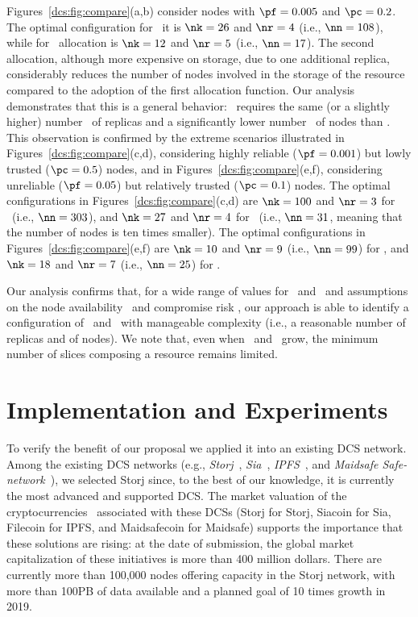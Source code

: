 {Figures~\ref{dcs:fig:compare}(a,b) consider nodes with $\pf=0.005$ and
$\pc=0.2$. The optimal configuration for \diagonal\ it is $\nk=26$ and
$\nr=4$ (i.e., $\nn=108$), while for \compact\ allocation is $\nk=12$
and $\nr=5$ (i.e., $\nn=17$). The second allocation, although more
expensive on storage, due to one additional replica, considerably
reduces the number of nodes involved in the storage of the resource
compared to the adoption of the first allocation function. Our
analysis demonstrates that this is a general behavior:
\compact\ requires the same (or a slightly higher) number \R\ of
replicas and a significantly lower number \N\ of nodes than
\diagonal. This observation is confirmed by the extreme scenarios
illustrated in Figures~\ref{dcs:fig:compare}(c,d), considering highly
reliable ($\pf = 0.001$) but lowly trusted ($\pc = 0.5$) nodes, and in
Figures~\ref{dcs:fig:compare}(e,f), considering unreliable ($\pf = 0.05$)
but relatively trusted ($\pc = 0.1$) nodes.  The optimal
configurations in Figures~\ref{dcs:fig:compare}(c,d) are $\nk=100$ and
$\nr=3$ for \diagonal\ (i.e., $\nn=303$), and $\nk=27$ and $\nr=4$ for
\compact\ (i.e., $\nn=31$, meaning that the number of nodes is ten
times smaller). The optimal configurations in
Figures~\ref{dcs:fig:compare}(e,f) are $\nk=10$ and $\nr=9$ (i.e.,
$\nn=99$) for \diagonal, and $\nk=18$ and $\nr=7$ (i.e., $\nn=25$) for
\compact.


Our analysis confirms that, for a wide range of values
for \PF\ and \PC\ and assumptions on the node availability \pf\ and
compromise risk \pc, our approach is able to identify a configuration
of \R\ and \K\ with  manageable complexity (i.e., a reasonable number of replicas and of nodes). We note that, even when
\R\ and \K\ grow, the minimum number of slices composing a resource remains
limited. 




\section[Experiments]{Implementation and Experiments}\label{dcs:sect:implementation}
To verify the benefit of our proposal we applied it into an existing
DCS network. Among the existing DCS networks (e.g., {\em
  Storj}~\cite{wilkinson2014storj}, {\em Sia}~\cite{vorick2014sia},
{\em IPFS}~\cite{benet2014ipfs}, and {\em Maidsafe
  Safe-network}~\cite{lambert2014safenetwork}), we selected Storj
since, to the best of our knowledge, it is currently the most advanced
and supported DCS.  The market valuation of the
cryptocurrencies~\cite{cslr18} associated with these DCSs (Storj for
Storj, Siacoin for Sia, Filecoin for IPFS, and Maidsafecoin for
Maidsafe) supports the importance that these solutions are rising: at
the date of submission, the global market capitalization of these
initiatives is more than 400 million dollars.  There are currently
more than 100,000 nodes offering capacity in the Storj network, with
more than 100PB of data available and a planned goal of 10 times
growth in 2019.

}
